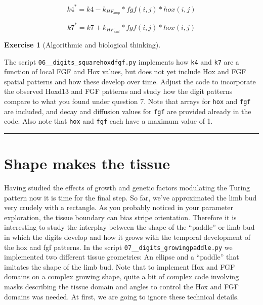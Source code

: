 \documentclass[
  letterpaper,
  DIV=11,
  numbers=noendperiod]{scrreprt}
\theoremstyle{definition}
\newtheorem{exercise}{Exercise}[chapter]
\theoremstyle{remark}
\begin{document}
\[
k4^* = k4 - k_{HF_{bmp}} * fgf(i,j) * hox(i,j)
\]

\[
k7^* = k7 + k_{HF_{wnt}} * fgf(i,j) * hox(i,j)
\]

\begin{exercise}[Algorithmic and biological
thinking]\protect\hypertarget{exr-tur}{}\label{exr-tur}

The script \texttt{06\_\_digits\_squarehoxdfgf.py} implements how
\texttt{k4} and \texttt{k7} are a function of local FGF and Hox values,
but does not yet include Hox and FGF spatial patterns and how these
develop over time. Adjust the code to incorporate the observed Hoxd13
and FGF patterns and study how the digit patterns compare to what you
found under question 7. Note that arrays for \texttt{hox} and
\texttt{fgf} are included, and decay and diffusion values for
\texttt{fgf} are provided already in the code. Also note that
\texttt{hox} and \texttt{fgf} each have a maximum value of 1.

\end{exercise}

\begin{center}\rule{0.5\linewidth}{0.5pt}\end{center}

\section{Shape makes the tissue}\label{shape-makes-the-tissue}

Having studied the effects of growth and genetic factors modulating the
Turing pattern now it is time for the final step. So far, we've
approximated the limb bud very crudely with a rectangle. As you probably
noticed in your parameter exploration, the tissue boundary can bias
stripe orientation. Therefore it is interesting to study the interplay
between the shape of the ``paddle'' or limb bud in which the digits
develop and how it grows with the temporal development of the hox and
fgf patterns. In the script \texttt{07\_\_digits\_growingpaddle.py} we
implemented two different tissue geometries: An ellipse and a ``paddle''
that imitates the shape of the limb bud. Note that to implement Hox and
FGF domains on a complex growing shape, quite a bit of complex code
involving masks describing the tissue domain and angles to control the
Hox and FGF domains was needed. At first, we are going to ignore these
technical details.
\end{document}
